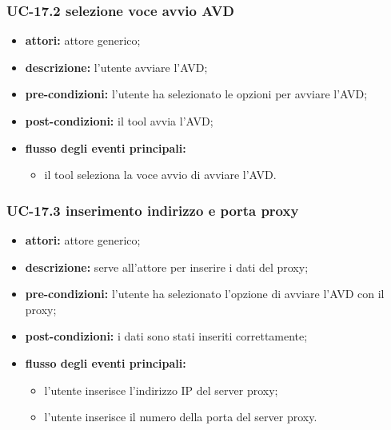 \subsubsection*{UC-17.2 selezione voce avvio AVD}
\begin{itemize}
    \item \textbf{attori:} attore generico;
    \item \textbf{descrizione:} l'utente avviare l'AVD;
    \item \textbf{pre-condizioni:} l'utente ha selezionato le opzioni per avviare l'AVD;
    \item \textbf{post-condizioni:} il tool avvia l'AVD;
    \item \textbf{flusso degli eventi principali:}
    \begin{itemize}
        \item il tool seleziona la voce avvio di avviare l'AVD.
    \end{itemize}
\end{itemize}
\subsubsection*{UC-17.3 inserimento indirizzo e porta proxy}
\begin{itemize}
    \item \textbf{attori:} attore generico;
    \item \textbf{descrizione:} serve all'attore per inserire i dati del proxy;
    \item \textbf{pre-condizioni:} l'utente ha selezionato l'opzione di avviare l'AVD con il proxy;
    \item \textbf{post-condizioni:} i dati sono stati inseriti correttamente;
    \item \textbf{flusso degli eventi principali:}
    \begin{itemize}
        \item l'utente inserisce l'indirizzo IP del server proxy;
        \item l'utente inserisce il numero della porta del server proxy.
    \end{itemize}
\end{itemize}

